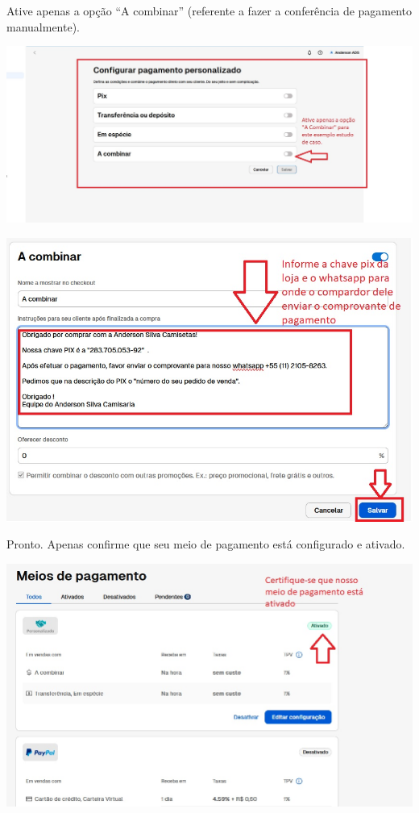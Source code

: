\documentclass[
]{book}
\begin{document}
Ative apenas a opção ``A combinar'' (referente a fazer a conferência de pagamento manualmente).

\includegraphics{images/np1/094-loja_virtual_meio_de_pagamento_personalizado_A_combinar.jpg}

\includegraphics{images/np1/095-loja_virtual_meio_de_pagamento_personalizado_A_combinar.jpg}

Pronto. Apenas confirme que seu meio de pagamento está configurado e ativado.

\includegraphics{images/np1/096-loja_virtual_meio_de_pagamento_personalizado_ativado.jpg}
\end{document}
